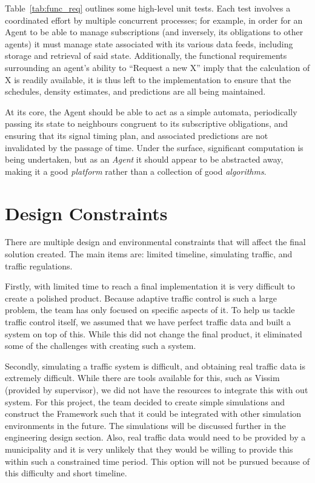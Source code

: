 \documentclass{report}
\begin{document}
Table~\ref{tab:func_req} outlines some high-level unit tests.
Each test involves a coordinated effort by multiple concurrent processes; for example, in order for an Agent to be able to manage subscriptions (and inversely, its obligations to other agents) it must manage state associated with its various data feeds, including storage and retrieval of said state.
Additionally, the functional requirements surrounding an agent's ability to ``Request a new X'' imply that the calculation of X is readily available, it is thus left to the implementation to ensure that the schedules, density estimates, and predictions are all being maintained.

At its core, the Agent should be able to act as a simple automata, periodically passing its state to neighbours congruent to its subscriptive obligations, and ensuring that its signal timing plan, and associated predictions are not invalidated by the passage of time.
Under the surface, significant computation is being undertaken, but as an \emph{Agent} it should appear to be abstracted away, making it a good \emph{platform} rather than a collection of good \emph{algorithms}.


\section{Design Constraints}
There are multiple design and environmental constraints that will affect the final solution created.
The main items are: limited timeline, simulating traffic, and traffic regulations.

Firstly, with limited time to reach a final implementation it is very difficult to create a polished product.
Because adaptive traffic control is such a large problem, the team has only focused on specific aspects of it.
To help us tackle traffic control itself, we assumed that we have perfect traffic data and built a system on top of this.
While this did not change the final product, it eliminated some of the challenges with creating such a system.

Secondly, simulating a traffic system is difficult, and obtaining real traffic data is extremely difficult.
While there are tools available for this, such as Vissim (provided by supervisor), we did not have the resources to integrate this with out system.
For this project, the team decided to create simple simulations and construct the Framework such that it could be integrated with other simulation environments in the future.
The simulations will be discussed further in the engineering design section.
Also, real traffic data would need to be provided by a municipality and it is very unlikely that they would be willing to provide this within such a constrained time period.
This option will not be pursued because of this difficulty and short timeline.
\end{document}
